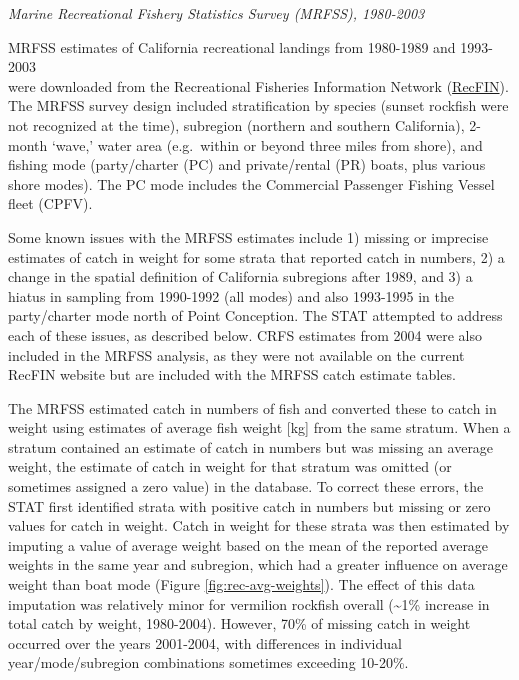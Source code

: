 \documentclass[11pt,
  english,
  a4paper,
]{article}
\begin{document}
\emph{Marine Recreational Fishery Statistics Survey (MRFSS), 1980-2003}

MRFSS estimates of California recreational landings from 1980-1989 and 1993-2003\\
were downloaded from the Recreational Fisheries Information Network ({\href{https://www.recfin.org/}{RecFIN}\leavevmode\tagmcend\tagstructend}). The MRFSS survey design included stratification by species (sunset rockfish were not recognized at the time), subregion (northern and southern California), 2-month `wave,' water area (e.g.~within or beyond three miles from shore), and fishing mode (party/charter (PC) and private/rental (PR) boats, plus various shore modes). The PC mode includes the Commercial Passenger Fishing Vessel fleet (CPFV).

Some known issues with the MRFSS estimates include 1) missing or imprecise estimates of catch in weight for some strata that reported catch in numbers, 2) a change in the spatial definition of California subregions after 1989, and 3) a hiatus in sampling from 1990-1992 (all modes) and also 1993-1995 in the party/charter mode north of Point Conception. The STAT attempted to address each of these issues, as described below. CRFS estimates from 2004 were also included in the MRFSS analysis, as they were not available on the current RecFIN website but are included with the MRFSS catch estimate tables.

The MRFSS estimated catch in numbers of fish and converted these to catch in weight using estimates of average fish weight {[}kg{]} from the same stratum. When a stratum contained an estimate of catch in numbers but was missing an average weight, the estimate of catch in weight for that stratum was omitted (or sometimes assigned a zero value) in the database. To correct these errors, the STAT first identified strata with positive catch in numbers but missing or zero values for catch in weight. Catch in weight for these strata was then estimated by imputing a value of average weight based on the mean of the reported average weights in the same year and subregion, which had a greater influence on average weight than boat mode (Figure \ref{fig:rec-avg-weights}). The effect of this data imputation was relatively minor for vermilion rockfish overall (\textasciitilde1\% increase in total catch by weight, 1980-2004). However, 70\% of missing catch in weight occurred over the years 2001-2004, with differences in individual year/mode/subregion combinations sometimes exceeding 10-20\%.
\end{document}
